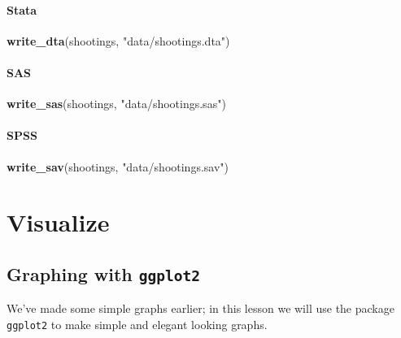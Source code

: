 \documentclass[
  12pt,
]{book}
\newenvironment{Shaded}{\begin{snugshade}}{\end{snugshade}}
\newcommand{\KeywordTok}[1]{\textcolor[rgb]{0.27,0.27,0.27}{\textbf{#1}}}
\newcommand{\NormalTok}[1]{#1}
\newcommand{\StringTok}[1]{\textcolor[rgb]{0.5,0.5,0.5}{#1}}
\begin{document}
\hypertarget{stata-1}{%
\subsection{Stata}\label{stata-1}}

\begin{Shaded}
\begin{Highlighting}[]
\KeywordTok{write\_dta}\NormalTok{(shootings, }\StringTok{"data/shootings.dta"}\NormalTok{)}
\end{Highlighting}
\end{Shaded}

\hypertarget{sas-1}{%
\subsection{SAS}\label{sas-1}}

\begin{Shaded}
\begin{Highlighting}[]
\KeywordTok{write\_sas}\NormalTok{(shootings, }\StringTok{"data/shootings.sas"}\NormalTok{)}
\end{Highlighting}
\end{Shaded}

\hypertarget{spss-1}{%
\subsection{SPSS}\label{spss-1}}

\begin{Shaded}
\begin{Highlighting}[]
\KeywordTok{write\_sav}\NormalTok{(shootings, }\StringTok{"data/shootings.sav"}\NormalTok{)}
\end{Highlighting}
\end{Shaded}

\hypertarget{part-visualize}{%
\part{Visualize}\label{part-visualize}}

\hypertarget{graphing-intro}{%
\chapter{\texorpdfstring{Graphing with \texttt{ggplot2}}{Graphing with ggplot2}}\label{graphing-intro}}

We've made some simple graphs earlier; in this lesson we will use the package \texttt{ggplot2} to make simple and elegant looking graphs.
\end{document}
